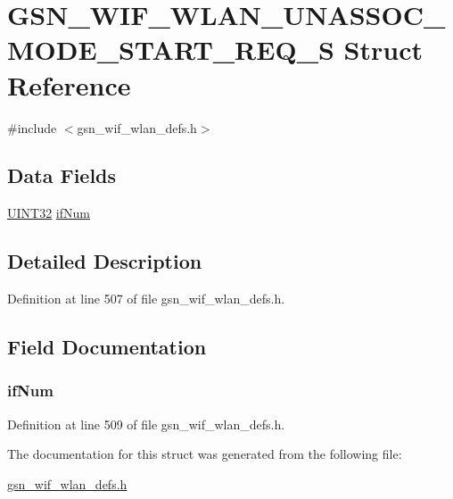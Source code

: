 \hypertarget{a00412}{
\section{GSN\_\-WIF\_\-WLAN\_\-UNASSOC\_\-MODE\_\-START\_\-REQ\_\-S Struct Reference}
\label{a00412}
}


{\ttfamily \#include $<$gsn\_\-wif\_\-wlan\_\-defs.h$>$}

\subsection*{Data Fields}
\begin{DoxyCompactItemize}
\item 
\hyperlink{a00660_gae1e6edbbc26d6fbc71a90190d0266018}{UINT32} \hyperlink{a00412_ab582fd779b13f74e06e2491389a60aa0}{ifNum}
\end{DoxyCompactItemize}


\subsection{Detailed Description}


Definition at line 507 of file gsn\_\-wif\_\-wlan\_\-defs.h.



\subsection{Field Documentation}
\hypertarget{a00412_ab582fd779b13f74e06e2491389a60aa0}{
\subsubsection[{ifNum}]{ {\bf ifNum}}}
\label{a00412_ab582fd779b13f74e06e2491389a60aa0}


Definition at line 509 of file gsn\_\-wif\_\-wlan\_\-defs.h.



The documentation for this struct was generated from the following file:\begin{DoxyCompactItemize}
\item 
\hyperlink{a00613}{gsn\_\-wif\_\-wlan\_\-defs.h}\end{DoxyCompactItemize}
